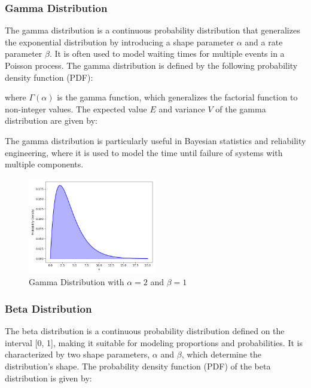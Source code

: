 \subsubsection{Gamma Distribution}\label{Gamma Distribution}
The gamma distribution is a continuous probability distribution that generalizes the exponential distribution by introducing a shape parameter $\alpha$ and a rate parameter $\beta$. It is often used to model waiting times for multiple events in a Poisson process. The gamma distribution is defined by the following probability density function (PDF):

where $\Gamma(\alpha)$ is the gamma function, which generalizes the factorial function to non-integer values. The expected value $E$ and variance $V$ of the gamma distribution are given by:


The gamma distribution is particularly useful in Bayesian statistics and reliability engineering, where it is used to model the time until failure of systems with multiple components.

\begin{figure}[h]
    \centering
    \includegraphics[width=0.5\textwidth]{../images/plot_gamma_distribution.png}
    \caption{Gamma Distribution with $\alpha=2$ and $\beta=1$}
    \label{fig:gamma_distribution}
\end{figure}

\subsubsection{Beta Distribution}\label{Beta Distribution}
The beta distribution is a continuous probability distribution defined on the interval [0, 1], making it suitable for modeling proportions and probabilities. It is characterized by two shape parameters, $\alpha$ and $\beta$, which determine the distribution's shape. The probability density function (PDF) of the beta distribution is given by:


